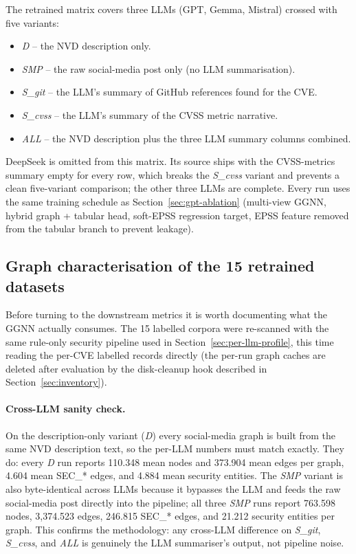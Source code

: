 \documentclass[11pt,a4paper]{article}
\begin{document}
The retrained matrix covers three LLMs (GPT, Gemma,
Mistral) crossed with five variants:
\begin{itemize}[leftmargin=*, itemsep=0pt]
    \item \emph{D} -- the NVD description only.
    \item \emph{SMP} -- the raw social-media post only (no
    LLM summarisation).
    \item \emph{S\_git} -- the LLM's summary of GitHub
    references found for the CVE.
    \item \emph{S\_cvss} -- the LLM's summary of the CVSS
    metric narrative.
    \item \emph{ALL} -- the NVD description plus the three
    LLM summary columns combined.
\end{itemize}
DeepSeek is omitted from this matrix. Its source ships
with the CVSS-metrics summary empty for every row, which
breaks the \emph{S\_cvss} variant and prevents a clean
five-variant comparison; the other three LLMs are
complete. Every run uses the same training schedule as
Section~\ref{sec:gpt-ablation} (multi-view GGNN, hybrid
graph + tabular head, soft-EPSS regression target, EPSS
feature removed from the tabular branch to prevent
leakage).

\subsection{Graph characterisation of the 15 retrained
datasets}
\label{sec:smp-graph-characterisation}

Before turning to the downstream metrics it is worth
documenting what the GGNN actually consumes. The 15
labelled corpora were re-scanned with the same rule-only
security pipeline used in
Section~\ref{sec:per-llm-profile}, this time reading the
per-CVE labelled records directly (the per-run graph
caches are deleted after evaluation by the disk-cleanup
hook described in Section~\ref{sec:inventory}).

\paragraph{Cross-LLM sanity check.}
On the description-only variant (\emph{D}) every social-media
graph is built from the same NVD description text, so the
per-LLM numbers must match exactly. They do: every \emph{D}
run reports 110.348 mean nodes and 373.904 mean edges per
graph, 4.604 mean SEC\_* edges, and 4.884 mean security
entities. The \emph{SMP} variant is also byte-identical
across LLMs because it bypasses the LLM and feeds the raw
social-media post directly into the pipeline; all three
\emph{SMP} runs report 763.598 nodes, 3{,}374.523 edges,
246.815 SEC\_* edges, and 21.212 security entities per
graph. This confirms the methodology: any cross-LLM
difference on \emph{S\_git}, \emph{S\_cvss}, and
\emph{ALL} is genuinely the LLM summariser's output, not
pipeline noise.
\end{document}
